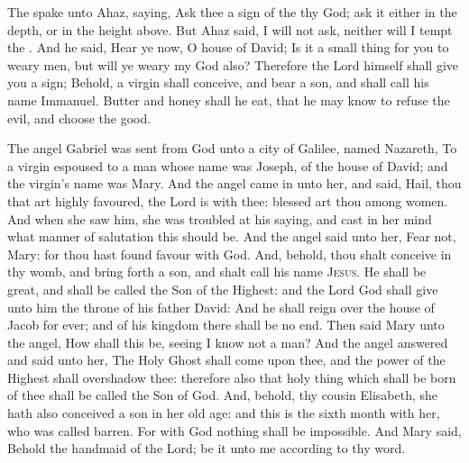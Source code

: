 \vspace{-1ex}

 The  spake unto Ahaz, saying, Ask thee a sign of the  thy God; ask it either in the depth, or in the height above. But Ahaz said, I will not ask, neither will I tempt the . And he said, Hear ye now, O house of David; Is it a small thing for you to weary men, but will ye weary my God also? Therefore the Lord himself shall give you a sign; Behold, a virgin shall conceive, and bear a son, and shall call his name Immanuel. Butter and honey shall he eat, that he may know to refuse the evil, and choose the good.

 The angel Gabriel was sent from God unto a city of Galilee, named Nazareth, To a virgin espoused to a man whose name was Joseph, of the house of David; and the virgin's name was Mary. And the angel came in unto her, and said, Hail, thou that art highly favoured, the Lord is with thee: blessed art thou among women. And when she saw him, she was troubled at his saying, and cast in her mind what manner of salutation this should be. And the angel said unto her, Fear not, Mary: for thou hast found favour with God. And, behold, thou shalt conceive in thy womb, and bring forth a son, and shalt call his name \textsc{Jesus}. He shall be great, and shall be called the Son of the Highest: and the Lord God shall give unto him the throne of his father David: And he shall reign over the house of Jacob for ever; and of his kingdom there shall be no end. Then said Mary unto the angel, How shall this be, seeing I know not a man? And the angel answered and said unto her, The Holy Ghost shall come upon thee, and the power of the Highest shall overshadow thee: therefore also that holy thing which shall be born of thee shall be called the Son of God. And, behold, thy cousin Elisabeth, she hath also conceived a son in her old age: and this is the sixth month with her, who was called barren. For with God nothing shall be impossible. And Mary said, Behold the handmaid of the Lord; be it unto me according to thy word.

